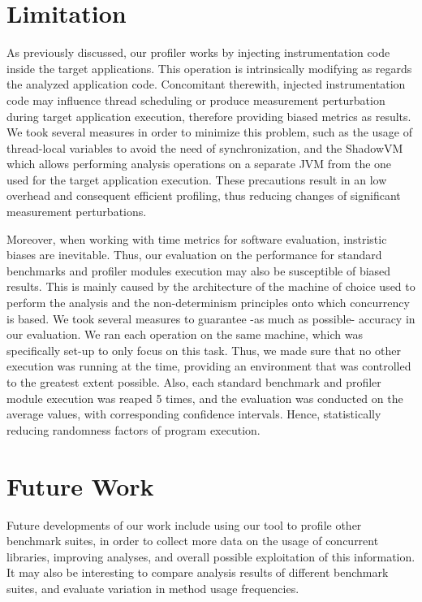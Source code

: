 \documentclass[]{usiinfthesis}
\begin{document}
\section{Limitation}
As previously discussed, our profiler works by injecting instrumentation code inside the target applications. This operation is intrinsically modifying as regards the analyzed application code. Concomitant therewith, injected instrumentation code may influence thread scheduling or produce measurement perturbation during target application execution, therefore providing biased metrics as results. We took several measures in order to minimize this problem, such as the usage of thread-local variables to avoid the need of synchronization, and the ShadowVM which allows performing analysis operations on a separate JVM from the one used for the target application execution. These precautions result in an low overhead and consequent efficient profiling, thus reducing changes of significant measurement perturbations.

Moreover, when working with time metrics for software evaluation, instristic biases are inevitable. Thus, our evaluation on the performance for standard benchmarks and profiler modules execution may also be susceptible of biased results. This is mainly caused by the architecture of the machine of choice used to perform the analysis and the non-determinism principles onto which concurrency is based. We took several measures to guarantee -as much as possible- accuracy in our evaluation. We ran each operation on the same machine, which was specifically set-up to only focus on this task. Thus, we made sure that no other execution was running at the time, providing an environment that was controlled to the greatest extent possible. Also, each standard benchmark and profiler module execution was reaped 5 times, and the evaluation was conducted on the average values, with corresponding confidence intervals. Hence, statistically reducing randomness factors of program execution.



\section{Future Work}
Future developments of our work include using our tool to profile other benchmark suites, in order to collect more data on the usage of concurrent libraries, improving analyses, and overall possible exploitation of this information. It may also be interesting to compare analysis results of different benchmark suites, and evaluate variation in method usage frequencies.
\end{document}
